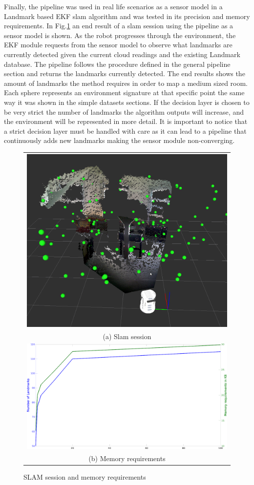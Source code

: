 \documentclass[]{article}
\begin{document}
    Finally, the pipeline was used in real life scenarios as a sensor model in a Landmark based EKF slam algorithm and was tested in its precision and memory requirements. In Fig.\ref{slam} an end result of a slam session using the pipeline as a sensor model is shown. As the robot progresses through the environment, the EKF module requests from the sensor model to observe what landmarks are currently detected given the current cloud readings and the existing Landmark database. The pipeline follows the procedure defined in the general pipeline section and returns the landmarks currently detected. The end results shows the amount of landmarks the method requires in order to map a medium sized room. Each sphere represents an environment signature at that specific point the same way it was shown in the simple datasets sections. If the decision layer is chosen to be very strict the number of landmarks the algorithm outputs will increase, and the environment will be represented in more detail. It is important to notice that a strict decision layer must be handled with care as it can lead to a pipeline that continuously adds new landmarks making the sensor module non-converging.


    \begin{figure}
        \begin{tabular}{c}
            \includegraphics[width=.353\textwidth]{slam110landmarks2} \\
            (a) Slam session \\
            \includegraphics[width=.353\textwidth]{memoryRequirements} \\
            (b) Memory requirements \\[6pt]
        \end{tabular}
        \caption{SLAM session and memory requirements}
        \label{slam}
    \end{figure}
\end{document}
